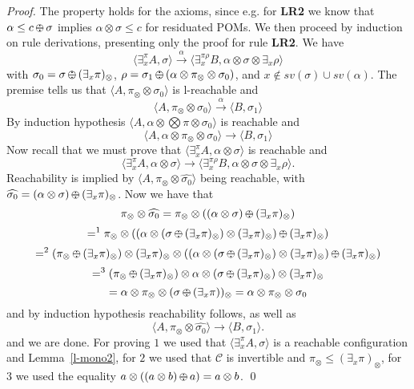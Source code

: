\documentclass{llncs}
\def\C{{\mathcal C}}
\def\C{{\mathcal C}}
\def\odiv{\, {\ominus\hspace{-7.7pt} \div} \,}
\begin{document}
\begin{proof}
The property holds for the axioms, since e.g. for {\bf LR2} we know that
$\alpha \leq c \odiv \sigma$ implies $\alpha \otimes \sigma \leq c$ for residuated POMs.
%
We then proceed by induction on rule derivations,
presenting only the proof for rule {\bf LR2}.
%
We have 
$$\langle \exists^\pi_x A, \sigma \rangle \xrightarrow{\alpha}
  \langle \exists^{\pi \rho}_x B, \alpha \otimes \sigma \otimes \exists_x \rho \rangle$$
  with $\sigma_0 = \sigma \odiv (\exists_x \pi)_\otimes$, $\rho = \sigma_1 \odiv (\alpha \otimes \pi_\otimes  \otimes \sigma_0)$, and 
  $x \not \in sv(\sigma) \cup sv(\alpha)$.
The premise tells us that $\langle A, \pi_\otimes \otimes \sigma_0 \rangle$ is l-reachable and
$$\langle A, \pi_\otimes \otimes \sigma_0 \rangle \xrightarrow{\alpha}
  \langle B, \sigma_1 \rangle$$
%
By induction hypothesis $\langle A, \alpha \otimes \bigotimes \pi \otimes \sigma_0 \rangle$ is reachable and
$$\langle A, \alpha \otimes \pi_\otimes \otimes \sigma_0 \rangle \to
  \langle B, \sigma_1 \rangle$$
Now recall that we must prove that $\langle \exists^\pi_x A, \alpha \otimes \sigma \rangle$ is reachable and
$$\langle \exists^\pi_x A, \alpha \otimes \sigma \rangle \to
  \langle \exists^{\pi \rho}_x B, \alpha \otimes \sigma \otimes \exists_x \rho \rangle.$$
Reachability is implied by $\langle A, \pi_\otimes \otimes \widehat{\sigma_0} \rangle$ being reachable,
 with $\widehat{\sigma_0} = (\alpha \otimes \sigma) \odiv (\exists_x \pi)_\otimes$.
%
Now we have that 
$$\pi_\otimes \otimes \widehat{\sigma_0} = \pi_\otimes \otimes ((\alpha \otimes \sigma) \odiv (\exists_x \pi)_\otimes)$$ 
$$=^1 \pi_\otimes \otimes ((\alpha \otimes (\sigma \odiv (\exists_x \pi)_\otimes) \otimes (\exists_x \pi )_\otimes) \odiv (\exists_x \pi)_\otimes)$$
$$=^2  (\pi_\otimes \odiv (\exists_x \pi)_\otimes) \otimes (\exists_x \pi)_\otimes \otimes 
((\alpha \otimes (\sigma \odiv (\exists_x \pi)_\otimes) \otimes  (\exists_x \pi)_\otimes) \odiv (\exists_x \pi)_\otimes)$$
$$ =^3 (\pi_\otimes \odiv (\exists_x \pi)_\otimes) \otimes \alpha \otimes (\sigma \odiv (\exists_x \pi)_\otimes) \otimes (\exists_x \pi)_\otimes$$
$$= \alpha \otimes \pi_\otimes \otimes  (\sigma \odiv (\exists_x \pi))_\otimes 
= \alpha \otimes \pi_\otimes \otimes  \sigma_0
$$
and by induction hypothesis reachability follows, as well as 
$$\langle A, \pi_\otimes \otimes \widehat{\sigma_0} \rangle \to \langle B, \sigma_1 \rangle.$$
and we are done. For proving $1$ we used that $\langle \exists^\pi_x A, \sigma \rangle$ is a reachable configuration
and Lemma~\ref{l-mono2}, for $2$ we used that $\C$ is invertible and $\pi_\otimes \leq (\exists_x \pi)_\otimes$,
for $3$ we used the equality $a \otimes ((a \otimes b) \odiv a) = a \otimes b$.
\qed
\end{proof}
\end{document}

